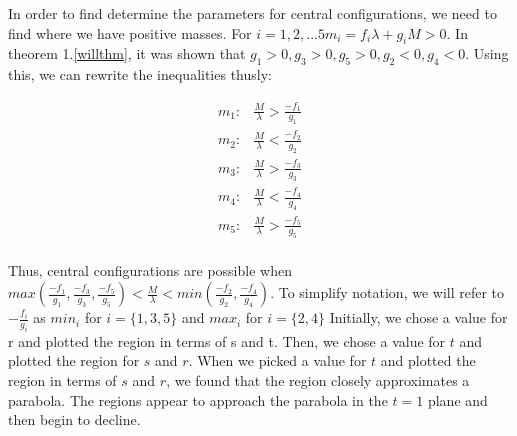 \documentclass[11pt,leqno]{article}
\theoremstyle{definition}
\theoremstyle{remark}
\numberwithin{equation}{section}
\begin{document}
In order to find determine the parameters for central configurations, we need to find where we have positive masses. For $i={1,2,...5} m_i = f_i\lambda + g_iM > 0$. In theorem 1.\ref{willthm}, it was shown that $g_1 > 0, g_3 > 0, g_5 > 0, g_2 < 0, g_4 < 0$. Using this, we can rewrite the inequalities thusly: 

\begin{equation} \begin{array}{ll}
m_1: & \frac{M}{\lambda} > \frac{-f_1}{g_1} \\
m_2: & \frac{M}{\lambda} < \frac{-f_2}{g_2} \\
m_3: & \frac{M}{\lambda} > \frac{-f_3}{g_3} \\
m_4: & \frac{M}{\lambda} < \frac{-f_4}{g_4} \\
m_5: & \frac{M}{\lambda} > \frac{-f_5}{g_5} \\
\end{array}
\end{equation}

Thus, central configurations are possible when $max(\frac{-f_1}{g_1},\frac{-f_3}{g_3},\frac{-f_5}{g_5})<\frac{M}{\lambda}<min(\frac{-f_2}{g_2},\frac{-f_4}{g_4})$. To simplify notation, we will refer to $-\frac{f_i}{g_i}$ as $min_i$ for $i=\{1,3,5\}$ and $max_i$ for $i=\{2,4\}$ Initially, we chose a value for r and plotted the region in terms of s and t. Then, we chose a value for $t$ and plotted the region for $s$ and $r$. When we picked a value for $t$ and plotted the region in terms of $s$ and $r$, we found that the region closely approximates a parabola. The regions appear to approach the parabola in the $t=1$ plane and then begin to decline.
\end{document}
